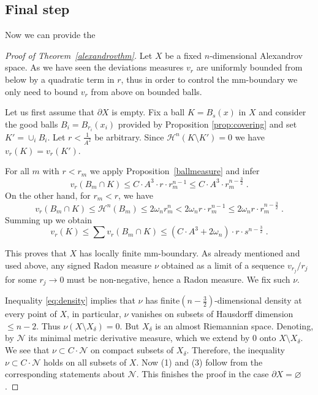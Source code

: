 \documentclass[12pt,leqno,intlimits]{amsart}
\numberwithin{equation}{section}
\theoremstyle{definition}
\theoremstyle{remark}
\newcommand{\pref}[1]{Proposition~\ref{#1}}
\def\emptyset{\varnothing}
\begin{document}
\subsection{Final step}
Now we can provide the
\begin{proof}[Proof of Theorem~\ref{alexandrovthm}]
Let $X$ be a fixed $n$-dimensional Alexandrov space.  As we have seen the deviations measures $v_r$ are uniformly bounded from below
by a quadratic term in $r$, thus  in order to control the mm-boundary we only need to bound $v_r$ from above on bounded balls.

Let us first assume that $\partial X$  is empty.  Fix a ball $K=B_s (x)$ in  $X$ and consider the good  balls $B_i=B_{r_i} (x_i)$ provided by Proposition \ref{prop:covering} and set $K'=\cup _i B_i$. Let $r<\frac 1 {A^2}$ be arbitrary.  Since $\mathcal H^n (K\setminus K')=0$
we have $ v_r (K)=v_r (K')$.

For all $m$ with $r<r_m$ we apply \pref{ballmeasure} and infer
$$v_r(B_m \cap K)\le C\cdot A^3 \cdot r\cdot r_m^{n-1} \leq C\cdot A^3 \cdot r_{m} ^{n- \frac 32} \; .$$
On the other hand, for $r_m<r$, we have
$$v_r (B_m\cap K) \leq \mathcal H^n  (B_m) \leq 2 \omega _n r_m ^n < 2\omega_n r \cdot r_m ^{n-1} \leq 2\omega_n r \cdot r_m ^{n- \frac 32} \; .$$
Summing up we obtain
\begin{equation} \label{eq:density}
v_r (K) \leq \sum v_r (B_m \cap K) \leq (C\cdot A^3+2\omega _n) \cdot r \cdot s^{n- \frac 32} \; .
\end{equation}

This proves that $X$ has locally finite mm-boundary.  As already mentioned and used above, any  signed Radon measure $\nu$ obtained as a limit of a sequence $v_{r_j} /r_j$ for some $r_j\to 0$ must be non-negative, hence a Radon measure.    We fix such $\nu$.

Inequality \eqref{eq:density} implies that $\nu$ has finite$(n-\frac 32)$-dimensional density at every point of $X$, in particular, $\nu$  vanishes on subsets of Hausdorff dimension $\leq n-2$.  Thus $\nu (X \setminus X_{\delta } )=0$.
But $X_{\delta}$ is an almost Riemannian space. Denoting, by $\mathcal N $ its minimal metric derivative measure, which we extend by $0$ onto $X\setminus X_{\delta}$.
 We see that $\nu \subset C\cdot \mathcal N$ on compact subsets of $X_{\delta}$.  Therefore, the inequality
 $\nu \subset C\cdot \mathcal N$ holds on all subsets of $X$.
  Now (1) and (3) follow from the corresponding statements about $\mathcal N$.
 This finishes the proof in the case $\partial X=\emptyset$.




\end{proof}
\end{document}
